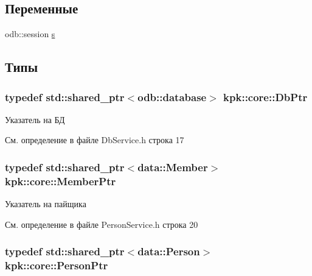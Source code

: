 \subsection*{Переменные}
\begin{DoxyCompactItemize}
\item 
odb\+::session \hyperlink{namespacekpk_1_1core_a4f9bed5f4644496878e2126c1c8e6412}{s}
\end{DoxyCompactItemize}


\subsection{Типы}
\subsubsection[{\texorpdfstring{Db\+Ptr}{DbPtr}}]{\setlength{\rightskip}{0pt plus 5cm}typedef std\+::shared\+\_\+ptr$<$odb\+::database$>$ {\bf kpk\+::core\+::\+Db\+Ptr}}\hypertarget{namespacekpk_1_1core_a466e66f45327171cc2976df1304573ab}{}\label{namespacekpk_1_1core_a466e66f45327171cc2976df1304573ab}


Указатель на БД 



См. определение в файле Db\+Service.\+h строка 17

\subsubsection[{\texorpdfstring{Member\+Ptr}{MemberPtr}}]{\setlength{\rightskip}{0pt plus 5cm}typedef std\+::shared\+\_\+ptr$<${\bf data\+::\+Member}$>$ {\bf kpk\+::core\+::\+Member\+Ptr}}\hypertarget{namespacekpk_1_1core_a51190e5694e0b82ddd1e02382ddd9586}{}\label{namespacekpk_1_1core_a51190e5694e0b82ddd1e02382ddd9586}


Указатель на пайщика 



См. определение в файле Person\+Service.\+h строка 20

\subsubsection[{\texorpdfstring{Person\+Ptr}{PersonPtr}}]{\setlength{\rightskip}{0pt plus 5cm}typedef std\+::shared\+\_\+ptr$<${\bf data\+::\+Person}$>$ {\bf kpk\+::core\+::\+Person\+Ptr}}\hypertarget{namespacekpk_1_1core_ab7506e35456bfb9d583bc7815bbb5ca4}{}\label{namespacekpk_1_1core_ab7506e35456bfb9d583bc7815bbb5ca4}


